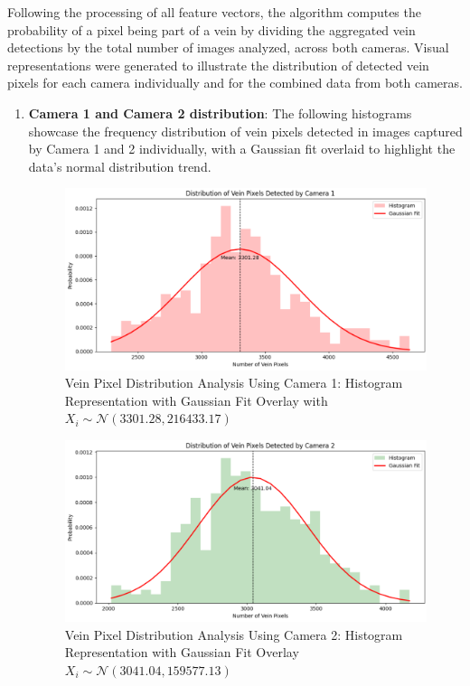 Following the processing of all feature vectors, the algorithm computes the probability of a pixel being part of a vein by dividing the aggregated vein detections by the total number of images analyzed, across both cameras. Visual representations were generated to illustrate the distribution of detected vein pixels for each camera individually and for the combined data from both cameras.
\newpage
\begin{enumerate}
    \item \textbf{Camera 1 and Camera 2 distribution}: The following histograms showcase the frequency distribution of vein pixels detected in images captured by Camera 1 and 2 individually, with a Gaussian fit overlaid to highlight the data's normal distribution trend.

    \begin{figure}[H]
        \centering
        \includegraphics[width=1\linewidth]{latex-img/distribution_veins_cam1.png}
        \caption{Vein Pixel Distribution Analysis Using Camera 1: Histogram Representation with Gaussian Fit Overlay with \(X_i \sim \mathcal{N}(3301.28, 216433.17)\)}
        \label{distribution_veins_cam1}
    \end{figure}

    \begin{figure}[H]
        \centering
        \includegraphics[width=1\linewidth]{latex-img/distribution_veins_cam2.png}
        \caption{Vein Pixel Distribution Analysis Using Camera 2: Histogram Representation with Gaussian Fit Overlay \(X_i \sim \mathcal{N}(3041.04, 159577.13)\)}
        \label{distribution_veins_cam2}
    \end{figure}
 

\end{enumerate}
